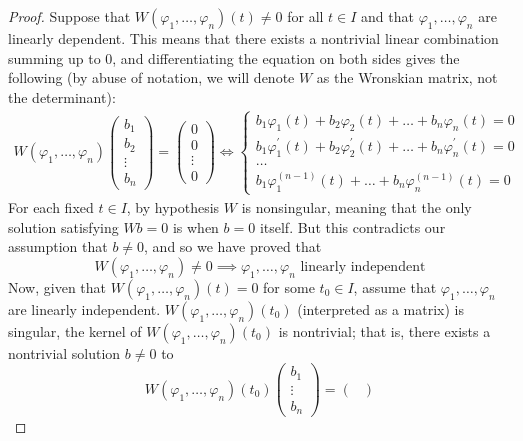 \documentclass{article}
\theoremstyle{remark}
\theoremstyle{definition}
\begin{document}
    \begin{proof}
    Suppose that $W(\varphi_1, \ldots, \varphi_n) (t) \neq 0$ for all $t \in I$ and that $\varphi_1, \ldots, \varphi_n$ are linearly dependent. This means that there exists a nontrivial linear combination summing up to $0$, and differentiating the equation on both sides gives the following (by abuse of notation, we will denote $W$ as the Wronskian matrix, not the determinant): 
    \begin{align*}
        W(\varphi_1, \ldots, \varphi_n) \begin{pmatrix}
        b_1 \\ b_2 \\ \vdots \\ b_n \end{pmatrix} = \begin{pmatrix}
        0 \\ 0 \\ \vdots \\ 0 \end{pmatrix} \iff
        \begin{cases}
        b_1 \varphi_1 (t) + b_2 \varphi_2 (t) + \ldots + b_n \varphi_n (t) = 0 \\
        b_1 \varphi^\prime_1 (t) + b_2 \varphi^\prime_2 (t) + \ldots + b_n \varphi^\prime_n (t) = 0 \\
        \ldots \\
        b_1 \varphi^{(n-1)}_1 (t) + \ldots + b_n \varphi^{(n-1)}_n (t) = 0 
        \end{cases}
    \end{align*}
    For each fixed $t \in I$, by hypothesis $W$ is nonsingular, meaning that the only solution satisfying $W b = 0$ is when $b = 0$ itself. But this contradicts our assumption that $b \neq 0$, and so we have proved that
    \[W(\varphi_1, \ldots, \varphi_n) \neq 0 \implies \varphi_1, \ldots, \varphi_n \text{ linearly independent}\]
    Now, given that $W(\varphi_1, \ldots, \varphi_n) (t) = 0$ for some $t_0 \in I$, assume that $\varphi_1, \ldots, \varphi_n$ are linearly independent. $W(\varphi_1, \ldots, \varphi_n)(t_0)$ (interpreted as a matrix) is singular, the kernel of $W(\varphi_1, \ldots, \varphi_n)(t_0)$ is nontrivial; that is, there exists a nontrivial solution $b \neq 0$ to 
    \[W(\varphi_1, \ldots, \varphi_n)(t_0) \begin{pmatrix}
    b_1 \\ \vdots \\ b_n \end{pmatrix}= \begin{pmatrix} 

\end{pmatrix}\]
\end{proof}
\end{document}

